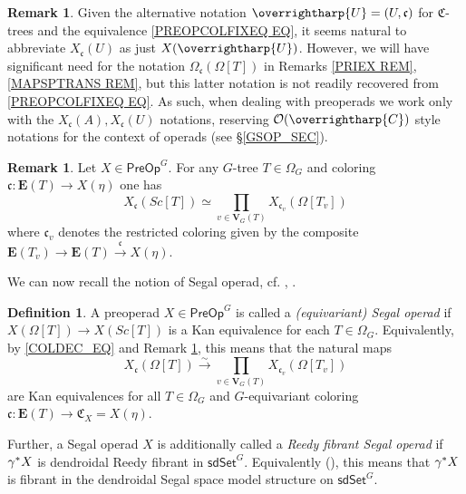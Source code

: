 \documentclass[a4paper,10pt]{article}%
\numberwithin{equation}{section}
\numberwithin{figure}{section}
\theoremstyle{definition} %
\newtheorem{definition}[equation]{Definition}%
\newtheorem{remark}[equation]{Remark}%
\newcommand{\vect}[1]{\text{\overrightharp{\ensuremath{#1}}}}
\newcommand{\sdSet}{\mathsf{sdSet}}
\renewcommand{\O}{\ensuremath{\mathcal O}}
\newcommand{\1}{\ensuremath{\mathbbm 1}}%
\begin{document}
\begin{remark}
	Given the alternative notation
	$\vect{U} = (U,\mathfrak{c})$
	for $\mathfrak{C}$-trees and the equivalence
	\eqref{PREOPCOLFIXEQ EQ}, 
	it seems natural to abbreviate 
	$X_{\mathfrak{c}}(U)$ as just $X(\vect{U})$.
	However, we will have significant need for the notation
	$\Omega_{\mathfrak{c}}(\Omega[T])$
	in Remarks \ref{PRIEX REM},\ref{MAPSPTRANS REM},
	but this latter notation is not readily recovered from 
	\eqref{PREOPCOLFIXEQ EQ}.
	As such, when dealing with preoperads we work only with the 
	$X_{\mathfrak{c}}(A),X_{\mathfrak{c}}(U)$
	notations,
	reserving $\O(\vect{C})$ style notations for the context of operads (see \S \ref{GSOP_SEC}).
\end{remark}



\begin{remark}\label{SCTCOLPR REM}
	Let $X \in \mathsf{PreOp}^G$.
	For any $G$-tree $T \in \Omega_G$
	and coloring 
	$\mathfrak{c} \colon \boldsymbol{E}(T) \to X(\eta)$
	one has
	\[
	X_{\mathfrak{c}}(Sc[T]) 
	\simeq
	\prod_{v \in \boldsymbol{V}_G(T)}
	X_{\mathfrak{c}_v}(\Omega[T_v]) 
	\]
where $\mathfrak{c}_v$
denotes the restricted coloring given by the composite
$\boldsymbol{E}(T_v) \to \boldsymbol{E}(T) 
\xrightarrow{\mathfrak{c}} X(\eta)$. 
\end{remark}


We can now recall the notion of 
Segal operad, 
cf. \cite[Def. 5.5]{CM13b}, \cite[Def. 4.40]{BP_edss}.


\begin{definition}\label{SEGCOLCHAR DEF}
	A preoperad $X \in \mathsf{PreOp}^G$ is called a \emph{(equivariant) Segal operad} if
	$X\left( \Omega[T] \right) \to 
	X \left( Sc[T] \right)$
	is a Kan equivalence for each $T \in \Omega_G$.
%
	Equivalently, by \eqref{COLDEC_EQ} %
	and Remark \ref{SCTCOLPR REM},
	this means that the natural maps
\begin{equation}\label{SEGCOLCHAR EQ}
	X_{\mathfrak{c}}(\Omega[T])
	\xrightarrow{\sim}
		\prod_{v \in \boldsymbol{V}_G(T)}
	X_{\mathfrak{c}_v}(\Omega[T_v])
\end{equation}
	are Kan equivalences for all 
	$T \in \Omega_G$
	and $G$-equivariant coloring
	$\mathfrak{c} \colon 
	\boldsymbol{E}(T) \to \mathfrak{C}_X = X(\eta)$.
	
	Further, a Segal operad $X$ is additionally called a
	\emph{Reedy fibrant Segal operad} 
	if $\gamma^{\**}X$ is dendroidal Reedy fibrant in $\sdSet^G$.
	Equivalently (\cite[Remark 4.41]{BP_edss}),
	this means that $\gamma^{\**}X$ is fibrant in the dendroidal Segal space model structure on $\sdSet^G$.
\end{definition}
\end{document}

